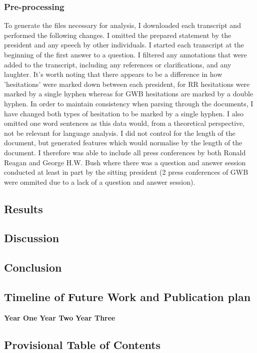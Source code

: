 \documentclass{article}
\begin{document}
\subsubsection{Pre-processing}
To generate the files necessary for analysis, I downloaded each transcript and performed the following changes. I omitted the prepared statement by the president and any speech by other individuals. I started each transcript at the beginning of the first answer to a question. I filtered any annotations that were added to the transcript, including any references or clarifications, and any laughter. It's worth noting that there appears to be a difference in how 'hesitations' were marked down between each president, for RR hesitations were marked by a single hyphen whereas for GWB hesitations are marked by a double hyphen. In order to maintain consistency when parsing through the documents, I have changed both types of hesitation to be marked by a single hyphen. I also omitted one word sentences as this data would, from a theoretical perspective, not be relevant for language analysis. I did not control for the length of the document, but generated features which would normalise by the length of the document. I therefore was able to include all press conferences by both Ronald Reagan and George H.W. Bush where there was a question and answer session conducted at least in part by the sitting president (2 press conferences of GWB were ommited due to a lack of a question and answer session).
\subsection{Results}
\subsection{Discussion}
\subsection{Conclusion}


\subsection{Timeline of Future Work and Publication plan}
\textbf{Year One} \newline
\textbf{Year Two} \newline
\textbf{Year Three} \newline


\subsection{Provisional Table of Contents}
\end{document}
